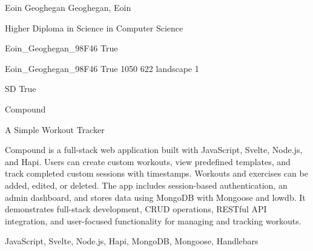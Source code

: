 \documentclass[twoside]{report}
\begin{document}
\begingroup{}\relax



\def\Key{Eoin_Geoghegan_98F46}

{Eoin Geoghegan}
{Geoghegan, Eoin}

{Higher Diploma in Science in Computer Science}

{Eoin_Geoghegan_98F46}
{True}

{Eoin_Geoghegan_98F46}
{True}
{1050}
{622}
{landscape}
{1}

{SD}
{True}

{Compound}

{A Simple Workout Tracker}

{Compound is a full-stack web application built with JavaScript, Svelte, Node.js, and Hapi. Users can create custom workouts, view predefined templates, and track completed custom sessions with timestamps. Workouts and exercises can be added, edited, or deleted. The app includes session-based authentication, an admin dashboard, and stores data using MongoDB with Mongoose and lowdb. It demonstrates full-stack development, CRUD operations, RESTful API integration, and user-focused functionality for managing and tracking workouts.}

{JavaScript, Svelte, Node.js, Hapi, MongoDB, Mongoose, Handlebars}
\end{document}
